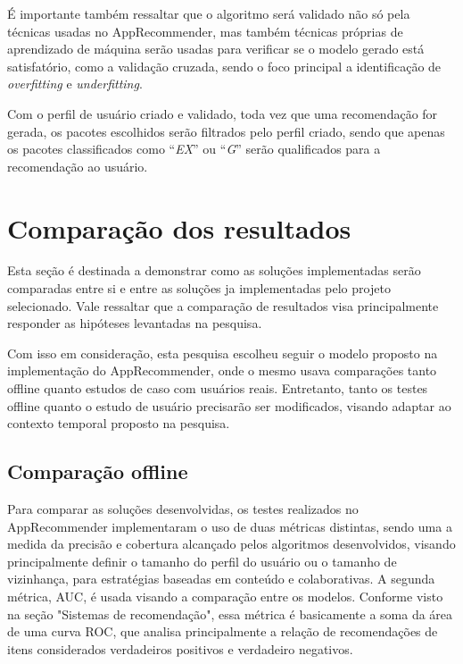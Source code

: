 É importante também ressaltar que o algoritmo será validado não só pela técnicas usadas no AppRecommender, mas também técnicas próprias de
aprendizado de máquina serão usadas para verificar se o modelo gerado está satisfatório, como a validação cruzada, sendo o foco principal a
identificação de \textit{overfitting} e \textit{underfitting}.

Com o perfil de usuário criado e validado, toda vez que uma recomendação for gerada, os pacotes escolhidos serão filtrados pelo perfil criado,
sendo que apenas os pacotes classificados como ``\textit{EX}'' ou ``\textit{G}'' serão qualificados para a recomendação ao usuário.

\section{Comparação dos resultados}

Esta seção é destinada a demonstrar como as soluções implementadas serão
comparadas entre si e entre as soluções ja implementadas pelo projeto
selecionado. Vale ressaltar que a comparação de resultados visa principalmente
responder as hipóteses levantadas na pesquisa.

Com isso em consideração, esta pesquisa escolheu seguir o modelo proposto na
implementação do AppRecommender, onde o mesmo usava comparações tanto offline
quanto estudos de caso com usuários reais. Entretanto, tanto os testes offline
quanto o estudo de usuário precisarão ser modificados, visando adaptar ao
contexto temporal proposto na pesquisa.

\subsection{Comparação offline}

Para comparar as soluções desenvolvidas, os testes realizados no AppRecommender
implementaram o uso de duas métricas distintas, sendo uma a  medida da precisão e
cobertura alcançado pelos algoritmos desenvolvidos, visando principalmente
definir o tamanho do perfil do usuário ou o tamanho de vizinhança, para
estratégias baseadas em conteúdo e colaborativas. A segunda métrica, AUC, é
usada visando a comparação entre os modelos. Conforme visto na seção "Sistemas
de recomendação", essa métrica é basicamente a soma da área de uma curva ROC,
que analisa principalmente a relação de recomendações de itens considerados
verdadeiros positivos e verdadeiro negativos.

